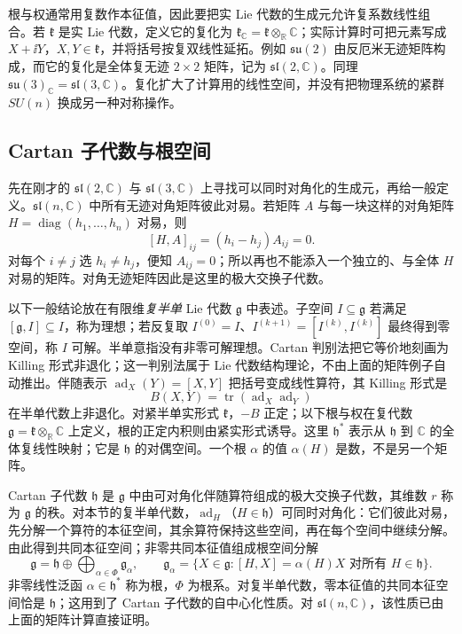 根与权通常用复数作本征值，因此要把实 Lie 代数的生成元允许复系数线性组合。若 $\mathfrak k$ 是实 Lie 代数，定义它的复化为 $\mathfrak k_{\mathbb C}=\mathfrak k\otimes_{\mathbb R}\mathbb C$；实际计算时可把元素写成 $X+\ii Y$，$X,Y\in\mathfrak k$，并将括号按复双线性延拓。例如 $\mathfrak{su}(2)$ 由反厄米无迹矩阵构成，而它的复化是全体复无迹 $2\times2$ 矩阵，记为 $\mathfrak{sl}(2,\mathbb C)$。同理 $\mathfrak{su}(3)_{\mathbb C}=\mathfrak{sl}(3,\mathbb C)$。复化扩大了计算用的线性空间，并没有把物理系统的紧群 $SU(n)$ 换成另一种对称操作。

\subsection{Cartan 子代数与根空间}

先在刚才的 $\mathfrak{sl}(2,\mathbb C)$ 与 $\mathfrak{sl}(3,\mathbb C)$ 上寻找可以同时对角化的生成元，再给一般定义。$\mathfrak{sl}(n,\mathbb C)$ 中所有无迹对角矩阵彼此对易。若矩阵 $A$ 与每一块这样的对角矩阵 $H=\operatorname{diag}(h_1,\ldots,h_n)$ 对易，则
\[
[H,A]_{ij}=(h_i-h_j)A_{ij}=0.
\]
对每个 $i\ne j$ 选 $h_i\ne h_j$，便知 $A_{ij}=0$；所以再也不能添入一个独立的、与全体 $H$ 对易的矩阵。对角无迹矩阵因此是这里的极大交换子代数。

以下一般结论放在有限维\emph{复半单} Lie 代数 $\mathfrak g$ 中表述。子空间 $I\subseteq\mathfrak g$ 若满足 $[\mathfrak g,I]\subseteq I$，称为理想；若反复取 $I^{(0)}=I$、$I^{(k+1)}=[I^{(k)},I^{(k)}]$ 最终得到零空间，称 $I$ 可解。半单意指没有非零可解理想。Cartan 判别法把它等价地刻画为 Killing 形式非退化；这一判别法属于 Lie 代数结构理论，不由上面的矩阵例子自动推出。伴随表示 $\operatorname{ad}_X(Y)=[X,Y]$ 把括号变成线性算符，其 Killing 形式是
\begin{equation}
B(X,Y)=\operatorname{tr}(\operatorname{ad}_X\operatorname{ad}_Y)
\label{eq:killing-form}
\end{equation}
在半单代数上非退化。对紧半单实形式 $\mathfrak k$，$-B$ 正定；以下根与权在复代数 $\mathfrak g=\mathfrak k\otimes_{\mathbb R}\mathbb C$ 上定义，根的正定内积则由紧实形式诱导。这里 $\mathfrak h^*$ 表示从 $\mathfrak h$ 到 $\mathbb C$ 的全体复线性映射；它是 $\mathfrak h$ 的对偶空间。一个根 $\alpha$ 的值 $\alpha(H)$ 是数，不是另一个矩阵。

\begin{definition}
Cartan 子代数 $\mathfrak h$ 是 $\mathfrak g$ 中由可对角化伴随算符组成的极大交换子代数，其维数 $r$ 称为 $\mathfrak g$ 的秩。对本节的复半单代数，$\operatorname{ad}_H$（$H\in\mathfrak h$）可同时对角化：它们彼此对易，先分解一个算符的本征空间，其余算符保持这些空间，再在每个空间中继续分解。由此得到共同本征空间；非零共同本征值组成根空间分解
\[
\mathfrak g=\mathfrak h
\oplus\bigoplus_{\alpha\in\Phi}\mathfrak g_\alpha,
\qquad \mathfrak g_\alpha
=\{X\in\mathfrak g:[H,X]=\alpha(H)X\text{ 对所有 }H\in\mathfrak h\}.
\]
非零线性泛函 $\alpha\in\mathfrak h^*$ 称为根，$\Phi$ 为根系。对复半单代数，零本征值的共同本征空间恰是 $\mathfrak h$；这用到了 Cartan 子代数的自中心化性质。对 $\mathfrak{sl}(n,\mathbb C)$，该性质已由上面的矩阵计算直接证明。
\end{definition}

